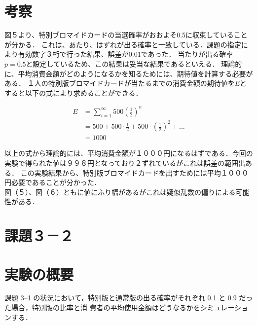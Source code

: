 \documentclass[fleqn, a4paper. 12pt]{ltjsarticle} %
\begin{document}
\section*{考察}
図５より、特別ブロマイドカードの当選確率がおおよそ0.5に収束していることが分かる．
これは、あたり、はずれが出る確率と一致している．課題の指定により有効数字３桁で行った結果、誤差が$0.01$であった．
当たりが出る確率$p=0.5$と設定しているため、この結果は妥当な結果であるといえる．
理論的に、平均消費金額がどのようになるかを知るためには、期待値を計算する必要がある．
１人の特別版ブロマイドカードが当たるまでの消費金額の期待値を$E$とすると以下の式により求めることができる．

\begin{align*}
  E &= \sum_{i=1}^{\infty} 500 \left(\frac{1}{2}\right)^n\\[8pt]
  &= 500 + 500 \cdot \frac{1}{2} + 500 \cdot \left(\frac{1}{2}\right)^2 + \ldots \\[8pt]
  &= 1000
\end{align*}

以上の式から理論的には、平均消費金額が１０００円になるはずである．今回の実験で得られた値は９９８円となっており２ずれているがこれは誤差の範囲出ある．
この実験結果から、特別版ブロマイドカードを出すためには平均１０００円必要であることが分かった．\\
図（５）、図（６）ともに値にふり幅があるがこれは疑似乱数の偏りによる可能性がある．
\newpage
\section*{課題３－２}
\section*{実験の概要}
課題 3–1 の状況において，特別版と通常版の出る確率がそれぞれ 0.1 と 0.9 だった場合，特別版の比率と消
費者の平均使用金額はどうなるかをシミュレーションする．
\end{document}
